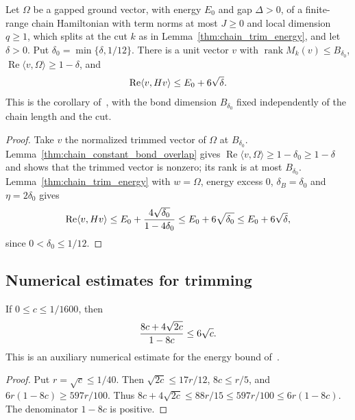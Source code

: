 \begin{lemma}
    \label{thm:chain_constant_rank_state}
    \leanok
    Let $\Omega$ be a gapped ground vector, with energy $E_0$ and gap
    $\Delta>0$, of a finite-range chain Hamiltonian with term norms at most
    $J\ge0$ and local dimension $q\ge1$, which splits at the cut $k$ as in
    Lemma~\ref{thm:chain_trim_energy}, and let $\delta>0$. Put
    $\delta_0=\min\{\delta,1/12\}$. There is a
    unit vector $v$ with $\operatorname{rank}M_k(v)\le B_{\delta_0}$,
    $\operatorname{Re}\langle v,\Omega\rangle\ge1-\delta$, and
    \begin{align}
        \operatorname{Re}\langle v,Hv\rangle\le
        E_0+6\sqrt\delta. \notag
    \end{align}
    This is the corollary of~\cite[lines 361--364]{Landau2015Polynomial},
    with the bond dimension $B_{\delta_0}$ fixed independently of the chain
    length and the cut.
\end{lemma}
\begin{proof}\leanok
    Take $v$ the normalized trimmed vector of $\Omega$ at $B_{\delta_0}$.
    Lemma~\ref{thm:chain_constant_bond_overlap} gives
    $\operatorname{Re}\langle v,\Omega\rangle\ge1-\delta_0\ge1-\delta$
    and shows that the trimmed vector is nonzero; its rank is at most
    $B_{\delta_0}$. Lemma~\ref{thm:chain_trim_energy} with $w=\Omega$,
    energy excess $0$, $\delta_B=\delta_0$ and $\eta=2\delta_0$ gives
    \begin{align}
        \operatorname{Re}\langle v,Hv\rangle
        \le E_0+\frac{4\sqrt{\delta_0}}{1-4\delta_0}
        \le E_0+6\sqrt{\delta_0}\le E_0+6\sqrt\delta, \notag
    \end{align}
    since $0<\delta_0\le1/12$.
\end{proof}

\subsection{Numerical estimates for trimming}

\begin{lemma}
    \label{thm:chain_numerical_trim_bound}
    \leanok
    If $0\le c\le1/1600$, then
    \begin{align}
        \frac{8c+4\sqrt{2c}}{1-8c}\le6\sqrt c. \notag
    \end{align}
    This is an auxiliary numerical estimate for the energy bound
    of~\cite[lines 509--515]{Landau2015Polynomial}.
\end{lemma}
\begin{proof}\leanok
    Put $r=\sqrt c\le1/40$. Then $\sqrt{2c}\le17r/12$,
    $8c\le r/5$, and $6r(1-8c)\ge597r/100$. Thus
    $8c+4\sqrt{2c}\le88r/15\le597r/100\le6r(1-8c)$.
    The denominator $1-8c$ is positive.
\end{proof}

